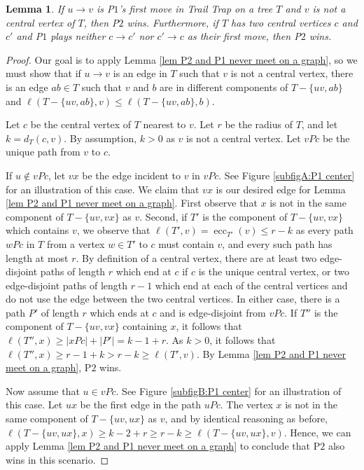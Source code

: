 \documentclass{article}
\theoremstyle{plain}
\newtheorem{lemma}[theorem]{Lemma}
\theoremstyle{definition}
\DeclareMathOperator{\ecc}{ecc}
\newcommand{\MaxTrail}{\ell}
\def\pone{{\rm{P}\ensuremath{1}}}
\def\ptwo{{\rm{P}\ensuremath{2}}}
\def\poneposs{{\rm{P}\ensuremath{1}'s}}
\begin{document}
\begin{lemma}\label{lem P1 must move towards a center}
    If $u \to v$ is \poneposs{} first move in {\sc Trail Trap} on a tree $T$ and $v$ is not a central vertex of $T$, then \ptwo{} wins. Furthermore, if $T$ has two central vertices $c$ and $c'$ and \pone{} plays neither $c\to c'$ nor $c'\to c$ as their first move, then \ptwo{} wins. 
\end{lemma}
\begin{proof}
    Our goal is to apply Lemma \ref{lem P2 and P1 never meet on a graph}, so we must show that if $u\to v$ is an edge in $T$ such that $v$ is not a central vertex, there is an edge $ab\in T$ such that $v$ and $b$ are in different components of $T - \{uv, ab\}$ and $\MaxTrail(T - \{uv, ab\}, v) \leq \MaxTrail(T - \{uv, ab\}, b)$. 
    
    Let $c$ be the central vertex of $T$ nearest to $v$. Let $r$ be the radius of $T$, and let $k = d_T(c,v)$. By assumption, $k > 0$ as $v$ is not a central vertex. Let $vPc$ be the unique path from $v$ to $c$. 
    
    If $u\notin vPc$, let $vx$ be the edge incident to $v$ in $vPc$. See Figure \ref{subfigA:P1 center} for an illustration of this case. We claim that $vx$ is our desired edge for Lemma \ref{lem P2 and P1 never meet on a graph}. First observe that $x$ is not in the same component of $T - \{uv,  vx\}$ as $v$. Second, if $T'$ is the component of $T - \{uv, vx\}$ which contains $v$, we observe that $\MaxTrail(T',v) = \ecc_{T'}(v) \leq r - k$ as every path $wPc$ in $T$ from a vertex $w\in T'$ to $c$ must contain $v$, and every such path has length at most $r$. By definition of a central vertex, there are at least two edge-disjoint paths of length $r$ which end at $c$ if $c$ is the unique central vertex, or two edge-disjoint paths of length $r - 1$ which end at each of the central vertices and do not use the edge between the two central vertices. In either case, there is a path $P'$ of length $r$ which ends at $c$ and is edge-disjoint from $vPc$. If $T''$ is the component of $T - \{uv, vx\}$ containing $x$, it follows that $\MaxTrail(T'',x) \geq |xPc| + |P'| = k - 1 + r$. As $k > 0$, it follows that $\MaxTrail(T'',x) \geq r - 1 + k > r - k \geq \MaxTrail(T',v)$. By Lemma \ref{lem P2 and P1 never meet on a graph}, \ptwo{} wins. 
    
    Now assume that $u\in vPc$. See Figure \ref{subfigB:P1 center} for an illustration of this case. Let $ux$ be the first edge in the path $uPc$. The vertex $x$ is not in the same component of $T - \{uv, ux\}$ as $v$, and by identical reasoning as before, $\MaxTrail(T - \{uv,ux\},x) \geq k - 2 + r  \geq r - k \geq  \MaxTrail(T - \{uv,ux\},v)$. Hence, we can apply Lemma \ref{lem P2 and P1 never meet on a graph} to conclude that \ptwo{} also wins in this scenario. 
    

\end{proof}
\end{document}
